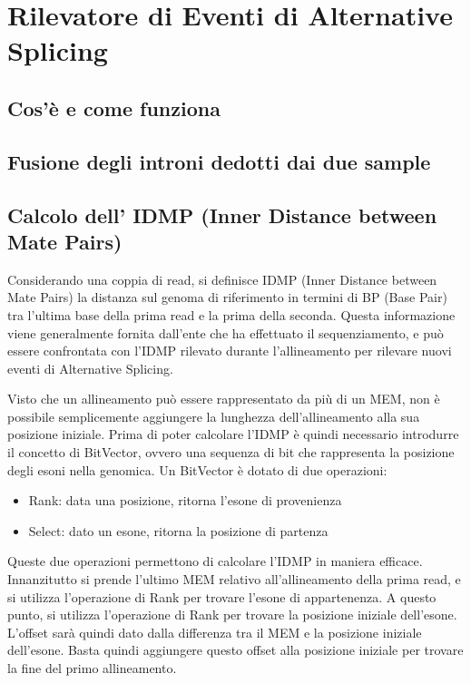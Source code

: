 \section{Rilevatore di Eventi di Alternative Splicing}

\subsection{Cos'è e come funziona}

\subsection{Fusione degli introni dedotti dai due sample}

\subsection{Calcolo dell' IDMP (Inner Distance between Mate Pairs)}
Considerando una coppia di read, si definisce IDMP (Inner Distance between Mate Pairs) la distanza sul genoma di riferimento in termini di BP (Base Pair) tra l'ultima base della prima read e la prima della seconda. Questa informazione viene generalmente fornita dall'ente che ha effettuato il sequenziamento, e può essere confrontata con l'IDMP rilevato durante l'allineamento per rilevare nuovi eventi di Alternative Splicing.

Visto che un allineamento può essere rappresentato da più di un MEM, non è possibile semplicemente aggiungere la lunghezza dell'allineamento alla sua posizione iniziale. Prima di poter calcolare l'IDMP è quindi necessario introdurre il concetto di BitVector, ovvero una sequenza di bit che rappresenta la posizione degli esoni nella genomica. Un BitVector è dotato di due operazioni:

\begin{itemize}
	\item Rank: data una posizione, ritorna l'esone di provenienza
	\item Select: dato un esone, ritorna la posizione di partenza 
\end{itemize}

Queste due operazioni permettono di calcolare l'IDMP in maniera efficace. Innanzitutto si prende l'ultimo MEM relativo all'allineamento della prima read, e si utilizza l'operazione di Rank per trovare l'esone di appartenenza. A questo punto, si utilizza l'operazione di Rank per trovare la posizione iniziale dell'esone. L'offset sarà quindi dato dalla differenza tra il MEM e la posizione iniziale dell'esone. Basta quindi aggiungere questo offset alla posizione iniziale per trovare la fine del primo allineamento.

